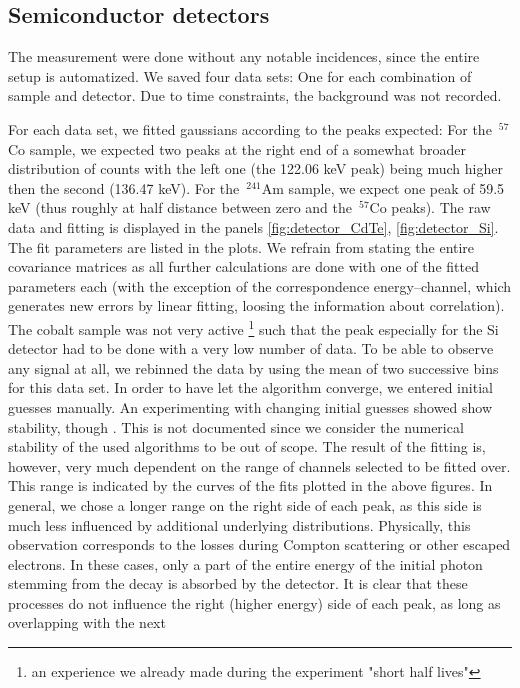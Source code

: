 \subsection{Semiconductor detectors}
The measurement were done without any notable incidences, since 
the entire setup is automatized. We saved four data sets:
One for each combination of sample and detector. Due to time constraints, 
the background was not recorded. 

For each data set, we fitted gaussians according to the peaks expected:
For the $\,^{57}$Co sample, we expected two peaks at the right end of a somewhat 
broader distribution of counts with the left one (the 122.06 keV peak) being much higher
then the second (136.47 keV). For the $\,^{241}$Am sample, we expect one peak of 59.5 keV 
(thus roughly at half distance between zero and the $\,^{57}$Co peaks). 
The raw data and fitting is displayed in the panels \ref{fig:detector_CdTe}, 
\ref{fig:detector_Si}.
The fit parameters are listed in the plots. We refrain from stating the entire covariance 
matrices as all further calculations are done with one of the fitted parameters 
each (with the exception of the correspondence energy--channel, which generates new 
errors by linear fitting, loosing the information about correlation). 
The cobalt sample was not very active%
\footnote{an experience we already made during the experiment "short half lives"} 
such that the peak especially for the Si detector had to be done with a very low 
number of data. To be able to observe any signal at all, we rebinned the data 
by using the mean of two successive bins for this data set. In order to have let 
the algorithm converge, we entered initial guesses manually. An experimenting 
with changing initial guesses showed show stability, though . This is not documented 
since we consider the numerical stability of the used algorithms to be 
out of scope. The result of the fitting is, however, very much dependent on the 
range of channels selected to be fitted over. This range is indicated by
the curves of the fits plotted in the above figures. In general, we chose 
a longer range on the right side of each peak, as this side is 
much less influenced by additional underlying distributions. 
Physically, this observation corresponds to the losses during Compton 
scattering or other escaped electrons. In these cases, 
only a part of the entire energy of the initial photon stemming from the decay 
is absorbed by the detector. It is clear that these processes do not influence 
the right (higher energy) side of each peak, as long as overlapping with the next 
